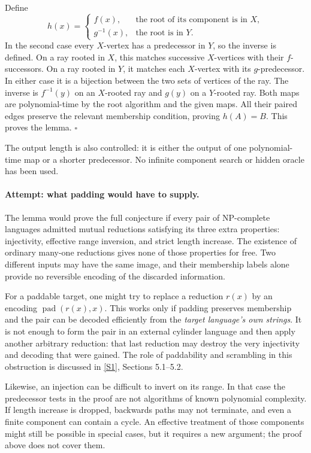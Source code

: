 \documentclass[11pt,a4paper]{article}
\newcommand{\sref}[2]{\hyperlink{source:#1:#2}{[S#2]}}
\numberwithin{equation}{section}
\begin{document}
Define
\begin{equation}\label{eq175-h}
 h(x)=\begin{cases}
       f(x),&\text{the root of its component is in }X,\\
       g^{-1}(x),&\text{the root is in }Y.
      \end{cases}
\end{equation}
In the second case every $X$-vertex has a predecessor in $Y$, so the
inverse is defined. On a ray rooted in $X$, this matches successive
$X$-vertices with their $f$-successors. On a ray rooted in $Y$, it matches
each $X$-vertex with its $g$-predecessor. In either case it is a bijection
between the two sets of vertices of the ray. The inverse is
$f^{-1}(y)$ on an $X$-rooted ray and $g(y)$ on a $Y$-rooted ray.
Both maps are polynomial-time by the root algorithm and the given maps.
All their paired edges preserve the relevant membership condition, proving
$h(A)=B$. This proves the lemma. \hfill$\square$

The output length is also controlled: it is either the output of one
polynomial-time map or a shorter predecessor. No infinite component search
or hidden oracle has been used.

\paragraph{Attempt: what padding would have to supply.}
The lemma would prove the full conjecture if every pair of NP-complete
languages admitted mutual reductions satisfying its three extra properties:
injectivity, effective range inversion, and strict length increase. The
existence of ordinary many-one reductions gives none of those properties
for free. Two different inputs may have the same image, and their membership
labels alone provide no reversible encoding of the discarded information.

For a paddable target, one might try to replace a reduction $r(x)$ by an
encoding $\operatorname{pad}(r(x),x)$. This works only if padding preserves
membership and the pair can be decoded efficiently from the \emph{target
language's own strings}. It is not enough to form the pair in an external
cylinder language and then apply another arbitrary reduction: that last
reduction may destroy the very injectivity and decoding that were gained.
The role of paddability and scrambling in this obstruction is discussed in
\sref{30006769}{1}, Sections 5.1--5.2.

Likewise, an injection can be difficult to invert on its range. In that
case the predecessor tests in the proof are not algorithms of known
polynomial complexity. If length increase is dropped, backwards paths
may not terminate, and even a finite component can contain a cycle.
An effective treatment of those components might still be possible in
special cases, but it requires a new argument; the proof above does not
cover them.
\end{document}
